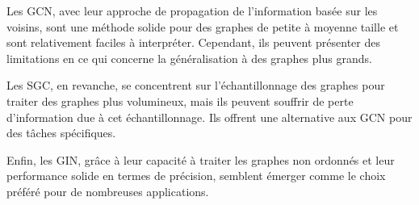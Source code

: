 \documentclass[a4paper]{article}
\begin{document}
Les GCN, avec leur approche de propagation de l'information basée sur les voisins, sont une méthode solide pour des graphes de petite à moyenne taille et sont relativement faciles à interpréter. Cependant, ils peuvent présenter des limitations en ce qui concerne la généralisation à des graphes plus grands.

Les SGC, en revanche, se concentrent sur l'échantillonnage des graphes pour traiter des graphes plus volumineux, mais ils peuvent souffrir de perte d'information due à cet échantillonnage. Ils offrent une alternative aux GCN pour des tâches spécifiques.

Enfin, les GIN, grâce à leur capacité à traiter les graphes non ordonnés et leur performance solide en termes de précision, semblent émerger comme le choix préféré pour de nombreuses applications.



\printbibliography
\end{document}
